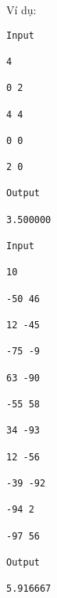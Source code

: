 Ví dụ:
\begin{verbatim}
Input

4

0 2

4 4

0 0

2 0

Output

3.500000

Input

10

-50 46

12 -45

-75 -9

63 -90

-55 58

34 -93

12 -56

-39 -92

-94 2

-97 56

Output

5.916667\end{verbatim}
